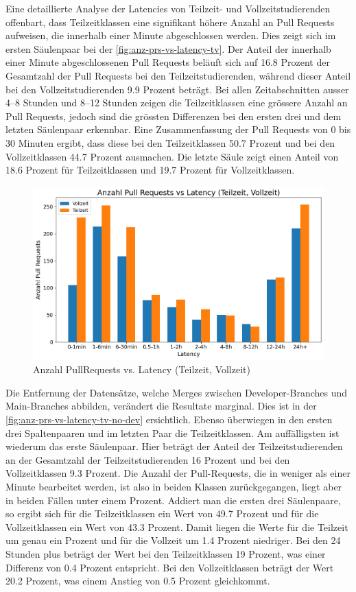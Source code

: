 \newpage
Eine detaillierte Analyse der Latencies von Teilzeit- und Vollzeitstudierenden offenbart, dass Teilzeitklassen eine signifikant höhere Anzahl an Pull Requests aufweisen, die innerhalb einer Minute abgeschlossen werden. Dies zeigt sich im ersten Säulenpaar bei der \autoref{fig:anz-prs-vs-latency-tv}. Der Anteil der innerhalb einer Minute abgeschlossenen Pull Requests beläuft sich auf 16.8 Prozent der Gesamtzahl der Pull Requests bei den Teilzeitstudierenden, während dieser Anteil bei den Vollzeitstudierenden 9.9 Prozent beträgt. Bei allen Zeitabschnitten ausser 4–8 Stunden und 8–12 Stunden zeigen die Teilzeitklassen eine grössere Anzahl an Pull Requests, jedoch sind die grössten Differenzen bei den ersten drei und dem letzten Säulenpaar erkennbar. Eine Zusammenfassung der Pull Requests von 0 bis 30 Minuten ergibt, dass diese bei den Teilzeitklassen 50.7 Prozent und bei den Vollzeitklassen 44.7 Prozent ausmachen. Die letzte Säule zeigt einen Anteil von 18.6 Prozent für Teilzeitklassen und 19.7 Prozent für Vollzeitklassen. 
\begin{figure}[htbp]
    \includegraphics[width=\textwidth]{Figures/anz-prs-vs-latency-tv.png}
    \caption{Anzahl PullRequests vs. Latency (Teilzeit, Vollzeit)}
    \label{fig:anz-prs-vs-latency-tv}
\end{figure}

Die Entfernung der Datensätze, welche Merges zwischen Developer-Branches und Main-Branches abbilden, verändert die Resultate marginal. Dies ist in der \autoref{fig:anz-prs-vs-latency-tv-no-dev} ersichtlich. Ebenso überwiegen in den ersten drei Spaltenpaaren und im letzten Paar die Teilzeitklassen. Am auffälligsten ist wiederum das erste Säulenpaar. Hier beträgt der Anteil der Teilzeitstudierenden an der Gesamtzahl der Teilzeitstudierenden 16 Prozent und bei den Vollzeitklassen 9.3 Prozent. Die Anzahl der Pull-Requests, die in weniger als einer Minute bearbeitet werden, ist also in beiden Klassen zurückgegangen, liegt aber in beiden Fällen unter einem Prozent.
Addiert man die ersten drei Säulenpaare, so ergibt sich für die Teilzeitklassen ein Wert von 49.7 Prozent und für die Vollzeitklassen ein Wert von 43.3 Prozent. Damit liegen die Werte für die Teilzeit um genau ein Prozent und für die Vollzeit um 1.4 Prozent niedriger. Bei den 24 Stunden plus beträgt der Wert bei den Teilzeitklassen 19 Prozent, was einer Differenz von 0.4 Prozent entspricht. Bei den Vollzeitklassen beträgt der Wert 20.2 Prozent, was einem Anstieg von 0.5 Prozent gleichkommt.

